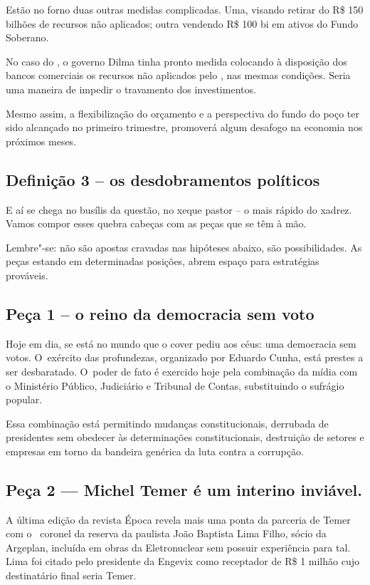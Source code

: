 Estão no forno duas outras medidas complicadas. Uma, visando retirar do
 R\$ 150 bilhões de recursos não aplicados; outra vendendo R\$ 100
bi em ativos do Fundo Soberano.

No caso do , o governo Dilma tinha pronto medida colocando à
disposição dos bancos comerciais os recursos não aplicados pelo ,
nas mesmas condições. Seria uma maneira de impedir o travamento dos
investimentos.

Mesmo assim, a flexibilização do orçamento e a perspectiva do fundo do
poço ter sido alcançado no primeiro trimestre, promoverá algum desafogo
na economia nos próximos meses.

\subsection{Definição 3 -- os desdobramentos políticos}

E aí se chega no busílis da questão, no xeque pastor -- o mais rápido do
xadrez. Vamos compor esses quebra cabeças com as peças que se têm à mão.

Lembre"-se: não são apostas cravadas nas hipóteses abaixo, são
 possibilidades. As peças estando em determinadas posições, abrem espaço
para estratégias prováveis.

\subsection{Peça 1 -- o reino da democracia sem voto}

Hoje em dia, se está no mundo que o  cover pediu aos céus: uma
democracia sem votos. O~exército das profundezas, organizado por Eduardo
Cunha, está prestes a ser desbaratado. O~poder de fato é exercido hoje
pela combinação da mídia com o Ministério Público, Judiciário e Tribunal
de Contas, substituindo o sufrágio popular.

Essa combinação está permitindo mudanças constitucionais, derrubada de
presidentes sem obedecer às determinações constitucionais, destruição de
setores e empresas em torno da bandeira genérica da luta contra a
corrupção.

\subsection{Peça 2 --- Michel Temer é um interino inviável.}

A última edição da revista Época revela mais uma ponta da parceria de
Temer com o~ coronel da reserva da  paulista João Baptista Lima Filho,
sócio da Argeplan, incluída em obras da Eletronuclear sem possuir
experiência para tal. Lima foi citado pelo presidente da Engevix como
receptador de R\$ 1 milhão cujo destinatário final seria Temer.

